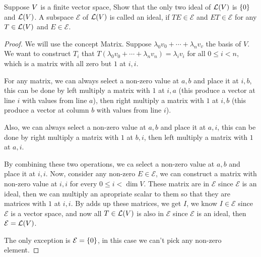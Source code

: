 \documentclass[../main.tex]{subfiles}
\begin{document}
\begin{exercise}
  Suppose $\mathnormal{V}$ is a finite vector space, Show that the only two ideal of
  $\mathcal{L}(\mathnormal{V})$ is $\{0\}$ and $\mathcal{L}(\mathnormal{V})$.
  A subspace $\mathcal{E}$ of $\mathcal{L}(\mathnormal{V})$ is called an ideal, 
  if $TE \in \mathcal{E}$ and $ET \in \mathcal{E}$ 
  for any $T \in \mathcal{L}(\mathnormal{V})$ and $E \in \mathcal{E}$.
\end{exercise}
\begin{proof}
  We will use the concept Matrix.
  Suppose $\lambda_0v_0 + \cdots + \lambda_nv_v$ the basis of $V$.
  We want to construct $T_i$ that $T(\lambda_0v_0 + \cdots + \lambda_nv_n) = \lambda_iv_i$ for all $0 \le i < n$,
  which is a matrix with all zero but $1$ at $i, i$.

  For any matrix, we can always select a non-zero value at $a, b$ and place it at $i, b$,
  this can be done by left multiply a matrix with $1$ at $i, a$
  (this produce a vector at line $i$ with values from line $a$),
  then right multiply a matrix with $1$ at $i, b$
  (this produce a vector at column $b$ with values from line $i$).

  Also, we can always select a non-zero value at $a, b$ and place it at $a, i$,
  this can be done by right multiply a matrix with $1$ at $b, i$,
  then left multiply a matrix with $1$ at $a, i$.

  By combining these two operations, we ca select a non-zero value at $a, b$ and place it at $i, i$.
  Now, consider any non-zero $E \in \mathcal{E}$, we can construct a
  matrix with non-zero value at $i, i$ for every $0 \le i < \dim V$. These matrix
  are in $\mathcal{E}$ since $\mathcal{E}$ is an ideal, then we can multiply an apropriate scalar
  to them so that they are matrices with $1$ at $i, i$. By adds up these matrices, we get $I$,
  we know $I \in \mathcal{E}$ since $\mathcal{E}$ is a vector space, and now all $T \in \mathcal{L}(V)$
  is also in $\mathcal{E}$ since $\mathcal{E}$ is an ideal, then $\mathcal{E} = \mathcal{L}(V)$.

  The only exception is $\mathcal{E} = \{0\}$, in this case we can't pick any non-zero element.
\end{proof}
\end{document}
